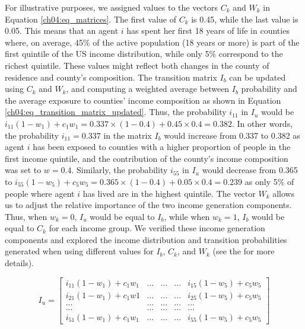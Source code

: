 \documentclass[class=article, crop=false, 12pt]{standalone}
\begin{document}
For illustrative purposes, we assigned values to the vectors $C_k$ and $W_k$ in Equation \ref{ch04:eq_matrices}. The first value of $C_k$ is 0.45, while the last value is 0.05. This means that an agent $i$ has spent her first 18 years of life in counties where, on average, 45\% of the active population (18 years or more) is part of the first quintile of the US income distribution, while only 5\% correspond to the richest quintile. These values might reflect both changes in the county of residence and county's composition. The transition matrix $I_b$ can be updated using $C_k$ and $W_k$, and computing a weighted average between $I_b$ probability and the average exposure to counties' income composition as shown in Equation \ref{ch04:eq_transition_matrix_updated}. Thus, the probability $i_{11}$ in $I_{u}$ would be $i_{11} (1-w_{1}) + c_{1} w_{1}  = 0.337 \times (1 - 0.4)  + 0.45 \times 0.4 =  0.382$. In other words, the probability $i_{11} = 0.337$ in the matrix $I_b$ would increase from 0.337 to 0.382 as agent $i$ has been exposed to counties with a higher proportion of people in the first income quintile, and the contribution of the county's income composition was set to $w=0.4$. Similarly, the probability $i_{55}$ in $I_{u}$ would decrease from 0.365 to $i_{55} (1-w_{5}) + c_{5} w_{5}  = 0.365 \times (1 - 0.4)  + 0.05 \times 0.4 =  0.239$ as only 5\% of people where agent $i$ has lived are in the highest quintile. The vector $W_k$ allows us to adjust the relative importance of the two income generation components. Thus, when $w_k=0$, $I_{u}$ would be equal to $I_b$, while when $w_k=1$, $I_b$ would be equal to $C_k$ for each income group. We verified these income generation components and explored the income distribution and transition probabilities generated when using different values for $I_b$, $C_k$, and $W_k$ (see the \textit{} for more details).

\vspace{-5pt}
\begin{equation}
\label{ch04:eq_transition_matrix_updated}
I_{u} = 
\begin{bmatrix}
 i_{11} (1-w_{1}) + c_{1} w_{1} & ... & ... & ... & i_{15} (1-w_{5}) + c_{5} w_{5} \\
i_{21} (1-w_{1}) + c_{1} w{1} & ... & ... & ... & i_{25} (1-w_{5}) + c_{5} w_{5}  \\
... & ... & ... & ... & ... \\
        ... & ... & ... & ... & ... \\
 i_{51} (1-w_{1}) + c_{1} w_{1}& ... & ... & ... &  i_{55} (1-w_{5}) + c_{5} w_{5}
\end{bmatrix}
\end{equation}
\vspace{5pt}
\end{document}
